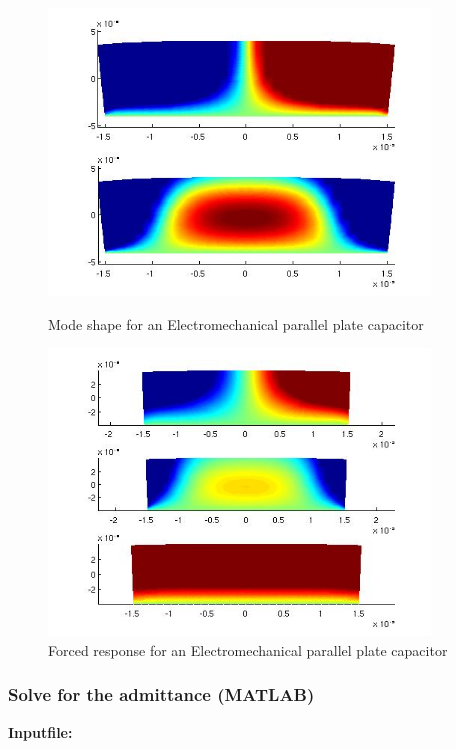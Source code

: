 \begin{figure}[htbp]
\centering
\includegraphics[height = 3in]{fig/em_pp_capacitor_mode.jpg}
\caption{Mode shape for an Electromechanical parallel plate capacitor}
\label{fig:ElectromechanicalParallelPlateCapacitorMode}
\includegraphics[height = 3in]{fig/em_pp_capacitor_forced.jpg}
\caption{Forced response for an Electromechanical parallel plate capacitor}
\label{fig:ElectromechanicalParallelPlateCapacitorForced}
\end{figure}

\clearpage
\subsubsection*{Solve for the admittance (MATLAB)}
\begin{flushleft}
  \textbf{Inputfile:}
  \\
\end{flushleft}
\hspace{1in}
{\footnotesize
{}
}

